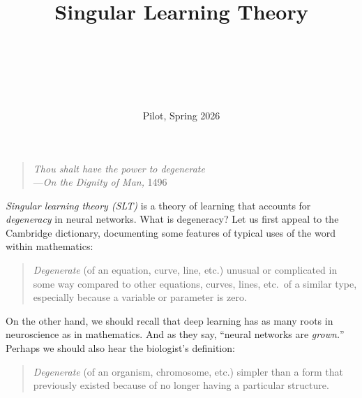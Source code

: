 \documentclass[11pt]{article}
\title{
    Singular Learning Theory
}
\author{
    \authorname{Kai Ogden}\\
    \affiliation{University of Oxford}
    \and
    \authorname{Matthew Farrugia-Roberts}\\
    \affiliation{University of Oxford}
    \and
    \authorname{Zach Furman}\\
    \affiliation{The University of Melbourne}
}
\date{%
    Pilot, Spring 2026
}
\begin{document}

\maketitle

\thispagestyle{copyright}

\bgroup
\renewcommand\section[2]{}
\setlength{\parskip}{0ex}
\tableofcontents
\egroup



\clearpage
\thispagestyle{empty}
\null
\vfill
\begin{quote}
    \centering
    \textit{Thou shalt have the power to degenerate}\\
    \qquad\qquad\qquad---\textit{On the Dignity of Man,} 1496
\end{quote}
\vfill
\vfill


\clearpage

\section*{Introduction}
\label{sec:intro}

\emph{Singular learning theory (SLT)} is a theory of learning that accounts for
\emph{degeneracy} in neural networks. What is degeneracy? Let us first appeal
to the Cambridge dictionary, documenting some features of typical uses of the
word within mathematics:
\begin{quote}
    \emph{Degenerate} (of an equation, curve, line, etc.) unusual or
    complicated in some way compared to other equations, curves, lines, etc.\
    of a similar type, especially because a variable or parameter is zero.
\end{quote}
On the other hand, we should recall that deep learning has as many roots in
neuroscience as in mathematics. And as they say, ``neural networks are
\emph{grown.}'' Perhaps we should also hear the biologist's definition:
\begin{quote}
    \emph{Degenerate} (of an organism, chromosome, etc.) simpler than a form
    that previously existed because of no longer having a particular structure.
\end{quote}
\end{document}
